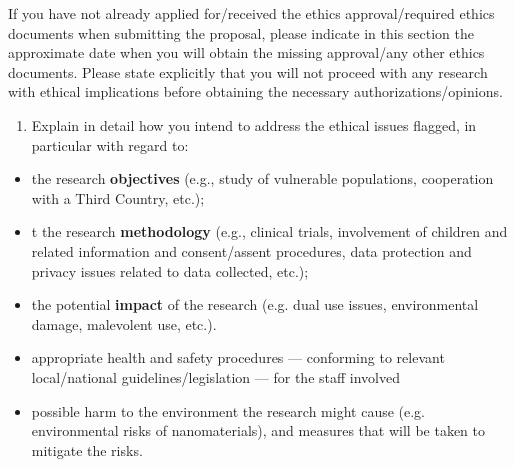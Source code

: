 If you have not already applied for/received the ethics
approval/required ethics documents when submitting the proposal,
please indicate in this section the approximate date when you will
obtain the missing approval/any other ethics documents. Please
state explicitly that you will not proceed with any research with
ethical implications before obtaining the necessary
authorizations/opinions.

\medskip\noindent
{}

\bigskip

{\bf
\begin{enumerate}[resume, start=2]
  \item Explain in detail how you intend to address the ethical
  issues flagged, in particular with regard to:
\end{enumerate}
} \begin{itemize}
    \item the research \textbf{objectives} (e.g., study
    of vulnerable populations, cooperation with a Third Country,
    etc.);

    \item t the research {\bf methodology} (e.g., clinical trials,
    involvement of children and related information and
    consent/assent procedures, data protection and
    privacy issues related to data collected, etc.);

    \item the potential {\bf impact} of the research (e.g. dual
    use issues, environmental damage, malevolent use, etc.).

    \item appropriate health and safety procedures --- conforming to
    relevant local/national guidelines/legislation --- for the staff
    involved 
    
    \item possible harm to the environment the research might
    cause (e.g. environmental risks of nanomaterials), and
    measures that will be taken to mitigate the risks.
\end{itemize}

